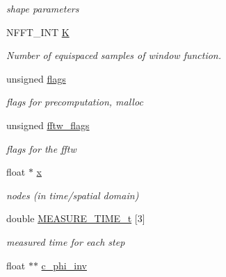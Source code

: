 \begin{DoxyCompactItemize}
\begin{DoxyCompactList}\small\item\em shape parameters \end{DoxyCompactList}\item 
N\-F\-F\-T\-\_\-\-I\-N\-T \hyperlink{structnfctf__plan_a0df82c55678182181b649079cf507eb1}{K}
\begin{DoxyCompactList}\small\item\em Number of equispaced samples of window function. \end{DoxyCompactList}\item 
\hypertarget{structnfctf__plan_adb7907d68b8f5af66e4e269dd5e93f3d}{unsigned \hyperlink{structnfctf__plan_adb7907d68b8f5af66e4e269dd5e93f3d}{flags}}\label{structnfctf__plan_adb7907d68b8f5af66e4e269dd5e93f3d}

\begin{DoxyCompactList}\small\item\em flags for precomputation, malloc \end{DoxyCompactList}\item 
\hypertarget{structnfctf__plan_afd3bc700b6adca6d3dde831c9a7aae79}{unsigned \hyperlink{structnfctf__plan_afd3bc700b6adca6d3dde831c9a7aae79}{fftw\-\_\-flags}}\label{structnfctf__plan_afd3bc700b6adca6d3dde831c9a7aae79}

\begin{DoxyCompactList}\small\item\em flags for the fftw \end{DoxyCompactList}\item 
\hypertarget{structnfctf__plan_acf91ba20ce671a5d4c971465fbd33b03}{float $\ast$ \hyperlink{structnfctf__plan_acf91ba20ce671a5d4c971465fbd33b03}{x}}\label{structnfctf__plan_acf91ba20ce671a5d4c971465fbd33b03}

\begin{DoxyCompactList}\small\item\em nodes (in time/spatial domain) \end{DoxyCompactList}\item 
\hypertarget{structnfctf__plan_a3621b32cd8ea93b2bcb8db6ce40cd5bb}{double \hyperlink{structnfctf__plan_a3621b32cd8ea93b2bcb8db6ce40cd5bb}{M\-E\-A\-S\-U\-R\-E\-\_\-\-T\-I\-M\-E\-\_\-t} \mbox{[}3\mbox{]}}\label{structnfctf__plan_a3621b32cd8ea93b2bcb8db6ce40cd5bb}

\begin{DoxyCompactList}\small\item\em measured time for each step \end{DoxyCompactList}\item 
\hypertarget{structnfctf__plan_a38d2c1dec96ad6d632133bc1dcbf82cb}{float $\ast$$\ast$ \hyperlink{structnfctf__plan_a38d2c1dec96ad6d632133bc1dcbf82cb}{c\-\_\-phi\-\_\-inv}}\label{structnfctf__plan_a38d2c1dec96ad6d632133bc1dcbf82cb}


\end{DoxyCompactItemize}
